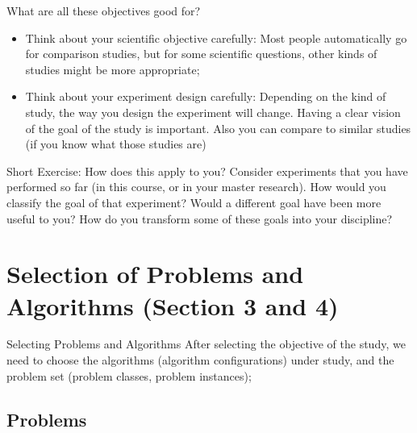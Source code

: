\documentclass[aspectratio=169]{beamer}
\begin{document}
\begin{frame}{What are all these objectives good for?}
  \begin{itemize}
    \item Think about your scientific objective carefully: Most people automatically go for comparison studies, but for some scientific questions, other kinds of studies might be more appropriate;
    
    \item Think about your experiment design carefully: Depending on the kind of study, the way you design the experiment will change. Having a clear vision of the goal of the study is important. Also you can compare to similar studies (if you know what those studies are)
  \end{itemize}

  \begin{block}{Short Exercise: How does this apply to you?}
    Consider experiments that you have performed so far (in this course, or in your master research). How would you classify the goal of that experiment? Would a different goal have been more useful to you? How do you transform some of these goals into your discipline?
  \end{block}
\end{frame}


\section{Selection of Problems and Algorithms (Section 3 and 4)}

\begin{frame}[t]{Selecting Problems and Algorithms}
  After selecting the objective of the study, we need to choose the algorithms (algorithm configurations) under study, and the problem set (problem classes, problem instances);
\end{frame}

\subsection{Problems}
\end{document}
